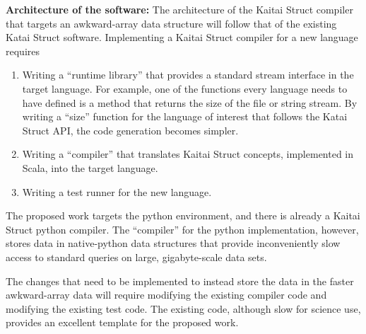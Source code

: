 \textbf{Architecture of the software:}
The architecture of the Kaitai Struct compiler that targets an awkward-array data structure will follow that of the existing Katai Struct software.  Implementing a Kaitai Struct compiler for a new language requires

\begin{enumerate}
    \item Writing a ``runtime library'' that provides a standard stream interface in the target language.  For example, one of the functions every language needs to have defined is a method that returns the size of the file or string stream.  By writing a ``size'' function for the language of interest that follows the Katai Struct API, the code generation becomes simpler.
    \item Writing a ``compiler'' that translates Kaitai Struct concepts, implemented in Scala, into the target language.
    \item Writing a test runner for the new language. 
\end{enumerate}

The proposed work targets the python environment, and there is already a Kaitai Struct python compiler.  The ``compiler'' for the python implementation, however, stores data in native-python data structures that provide inconveniently slow access to standard queries on large, gigabyte-scale data sets.  

The changes that need to be implemented to instead store the data in the faster awkward-array data will require modifying the existing compiler code and modifying the existing test code.  The existing code, although slow for science use, provides an excellent template for the proposed work.

\begin{comment}
\begin{lstlisting}
def [*size(self)*]:
    # Python has no internal File object API function to get
    # current file / StringIO size, thus we use the following
    # trick.
    io = self._io
    # Remember our current position
    [*cur_pos = *]io.tell()
    # Seek to the end of the File object
    io.seek(0, SEEK_END)
    # Remember position, which is equal to the full length
    [*full_size = *]io.tell()
    # Seek back to the current position
    [*io.seek(cur_pos)*]
[*return full_size*]
\end{lstlisting}

\begin{lstlisting}
uint64_t kaitai::kstream::[*size()*] {
    std::iostream::pos_type [*cur_pos = *]m_io->tellg();
    m_io->seekg(0, std::ios::end);
    std::iostream::pos_type [*len = *]m_io->tellg();
    [*m_io->seekg(cur_pos)*];
    [*return len*];
}
\caption{The details of this code are not important.  What is significant is the name of this function, size(), and its behavior: find and report the size of the file, without changing where we are in the file.  The Katai Struct compiler for both C++ and python can use the ``size()'' function rather than including these language-specific stream commands, making the compiler code more readable.}
\end{lstlisting}
\end{comment}

